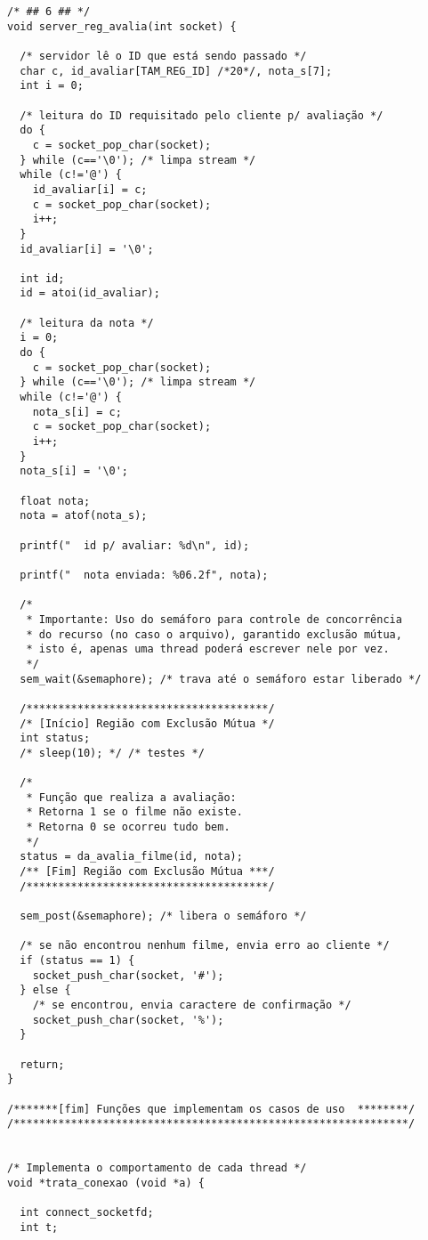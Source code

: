 \documentclass[11pt,twoside]{article}
\begin{document}
\begin{verbatim}
/* ## 6 ## */
void server_reg_avalia(int socket) {

  /* servidor lê o ID que está sendo passado */
  char c, id_avaliar[TAM_REG_ID] /*20*/, nota_s[7];
  int i = 0;

  /* leitura do ID requisitado pelo cliente p/ avaliação */
  do { 
    c = socket_pop_char(socket);
  } while (c=='\0'); /* limpa stream */
  while (c!='@') {
    id_avaliar[i] = c;
    c = socket_pop_char(socket);
    i++;
  }
  id_avaliar[i] = '\0';

  int id;
  id = atoi(id_avaliar);

  /* leitura da nota */
  i = 0;
  do { 
    c = socket_pop_char(socket);
  } while (c=='\0'); /* limpa stream */
  while (c!='@') {
    nota_s[i] = c;
    c = socket_pop_char(socket);
    i++;
  }
  nota_s[i] = '\0';

  float nota;
  nota = atof(nota_s);

  printf("  id p/ avaliar: %d\n", id);

  printf("  nota enviada: %06.2f", nota);

  /* 
   * Importante: Uso do semáforo para controle de concorrência
   * do recurso (no caso o arquivo), garantido exclusão mútua,
   * isto é, apenas uma thread poderá escrever nele por vez.
   */
  sem_wait(&semaphore); /* trava até o semáforo estar liberado */

  /**************************************/
  /* [Início] Região com Exclusão Mútua */
  int status;
  /* sleep(10); */ /* testes */
  
  /*
   * Função que realiza a avaliação:
   * Retorna 1 se o filme não existe.
   * Retorna 0 se ocorreu tudo bem.
   */
  status = da_avalia_filme(id, nota);
  /** [Fim] Região com Exclusão Mútua ***/
  /**************************************/

  sem_post(&semaphore); /* libera o semáforo */

  /* se não encontrou nenhum filme, envia erro ao cliente */
  if (status == 1) {
    socket_push_char(socket, '#');
  } else {
    /* se encontrou, envia caractere de confirmação */
    socket_push_char(socket, '%');
  }

  return;
}

/*******[fim] Funções que implementam os casos de uso  ********/
/**************************************************************/


/* Implementa o comportamento de cada thread */
void *trata_conexao (void *a) {
  
  int connect_socketfd;
  int t;


\end{verbatim}
\end{document}
